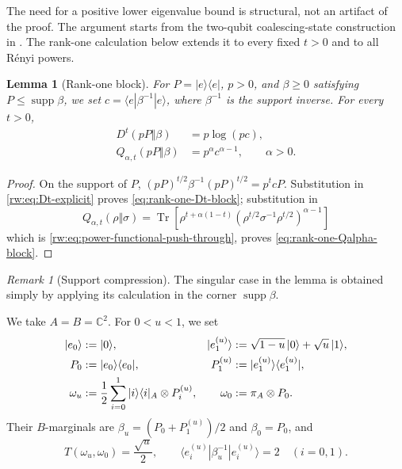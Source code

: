 \documentclass[11pt]{article}
\newtheorem{lemma}[lemma]{Lemma}
\theoremstyle{remark}
\newtheorem{remark}[remark]{Remark}
\newcommand{\1}{\mathbbm{1}}
\begin{document}
The need for a positive lower eigenvalue bound is structural, not an
artifact of the proof.
The argument starts from the two-qubit coalescing-state construction
in \cite[proof of Proposition~6.7]{bluhm2023continuity}.  The
rank-one calculation below extends it to every fixed $t>0$ and to all
R\'enyi powers.

\begin{lemma}[Rank-one block]
\label{lemma:rank-one-interpolated-block}
For $P=|e\rangle\langle e|$, $p>0$, and $\beta\geq0$ satisfying
$P\leq\operatorname{supp}\beta$, we set
$c=\langle e|\beta^{-1}|e\rangle$, where $\beta^{-1}$ is the
support inverse.  For every $t>0$,
\begin{align}
 D^t(pP\Vert\beta)&=p\log(pc),
 \label{eq:rank-one-Dt-block}\\
 Q_{\alpha,t}(pP\Vert\beta)&=p^\alpha c^{\alpha-1},
 \qquad \alpha>0.
 \label{eq:rank-one-Qalpha-block}
\end{align}
\end{lemma}

\begin{proof}
On the support of $P$,
$(pP)^{t/2}\beta^{-1}(pP)^{t/2}=p^tcP$.
Substitution in \eqref{rw:eq:Dt-explicit} proves
\eqref{eq:rank-one-Dt-block}; substitution in
\begin{equation}
 Q_{\alpha,t}(\rho\Vert\sigma)
 =\operatorname{Tr}\!\left[
 \rho^{t+\alpha(1-t)}
 (\rho^{t/2}\sigma^{-1}\rho^{t/2})^{\alpha-1}
 \right]
 \label{eq:boundary-Q-push-through}
\end{equation}
which is \eqref{rw:eq:power-functional-push-through}, proves
\eqref{eq:rank-one-Qalpha-block}.
\end{proof}

\begin{remark}[Support compression]
The singular case in the lemma is obtained simply by applying its
calculation in the corner $\operatorname{supp}\beta$.
\end{remark}

We take $A=B=\mathbb C^2$.  For $0<u<1$, we set
\begin{align}
 |e_0\rangle&:=|0\rangle,
 &|e_1^{(u)}\rangle&:=\sqrt{1-u}\,|0\rangle+\sqrt u\,|1\rangle,
 \notag\\
 P_0&:=|e_0\rangle\langle e_0|,
 &P_1^{(u)}&:=|e_1^{(u)}\rangle\langle e_1^{(u)}|,
 \label{eq:coalescing-pure-signals}\\
 \omega_u&:=\frac12\sum_{i=0}^1
 |i\rangle\langle i|_A\otimes P_i^{(u)},
 &\omega_0&:=\pi_A\otimes P_0.
 \label{eq:conditional-discontinuity-states}
\end{align}
Their $B$-marginals are
$\beta_u=(P_0+P_1^{(u)})/2$ and $\beta_0=P_0$, and
\begin{equation}
 T(\omega_u,\omega_0)=\frac{\sqrt u}{2},
 \qquad
 \langle e_i^{(u)}|\beta_u^{-1}|e_i^{(u)}\rangle=2
 \quad(i=0,1).
 \label{eq:coalescing-state-identities}
\end{equation}
\end{document}
